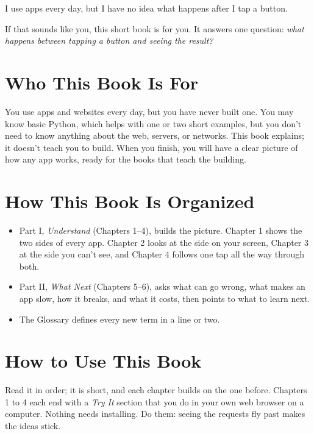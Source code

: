 
\begin{chapterintro}

I use apps every day, but I have no idea what happens after I tap a button.

\end{chapterintro}

If that sounds like you, this short book is for you. It answers one question: \emph{what happens between tapping a button and seeing the result?}

\section{Who This Book Is For}\label{00-preface:who-this-book-is-for}

You use apps and websites every day, but you have never built one. You may know basic Python, which helps with one or two short examples, but you don't need to know anything about the web, servers, or networks. This book explains; it doesn't teach you to build. When you finish, you will have a clear picture of how any app works, ready for the books that teach the building.

\section{How This Book Is Organized}\label{00-preface:how-this-book-is-organized}

\begin{itemize}
\tightlist
\item
  Part I, \emph{Understand} (Chapters 1--4), builds the picture. Chapter 1 shows the two sides of every app. Chapter 2 looks at the side on your screen, Chapter 3 at the side you can't see, and Chapter 4 follows one tap all the way through both.
\item
  Part II, \emph{What Next} (Chapters 5--6), asks what can go wrong, what makes an app slow, how it breaks, and what it costs, then points to what to learn next.
\item
  The Glossary defines every new term in a line or two.
\end{itemize}

\section{How to Use This Book}\label{00-preface:how-to-use-this-book}

Read it in order; it is short, and each chapter builds on the one before. Chapters 1 to 4 each end with a \emph{Try It} section that you do in your own web browser on a computer. Nothing needs installing. Do them: seeing the requests fly past makes the ideas stick.

